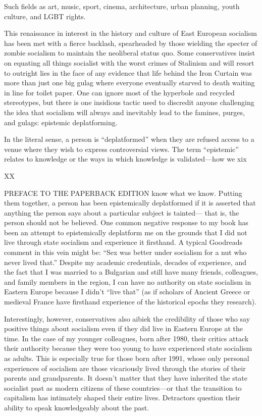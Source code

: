  \par 
Such fields as art, music, sport, cinema, architecture, urban planning, youth culture, and LGBT rights.
 \par 
This renaissance in interest in the history and culture of East European socialism has been met with a fierce backlash, spearheaded by those wielding the specter of zombie socialism to maintain the neoliberal status quo. Some conservatives insist on equating all things socialist with the worst crimes of Stalinism and will resort to outright lies in the face of any evidence that life behind the Iron Curtain was more than just one big gulag where everyone eventually starved to death waiting in line for toilet paper. One can ignore most of the hyperbole and recycled stereotypes, but there is one insidious tactic used to discredit anyone challenging the idea that socialism will always and inevitably lead to the famines, purges, and gulags: epistemic deplatforming.
 \par 
In the literal sense, a person is “deplatformed” when they are refused access to a venue where they wish to express controversial views. The term “epistemic” relates to knowledge or the ways in which knowledge is validated—how we xix
 \par 
XX
 \par 
PREFACE TO THE PAPERBACK EDITION know what we know. Putting them together, a person has been epistemically deplatformed if it is asserted that anything the person says about a particular subject is tainted— that is, the person should not be believed. One common negative response to my book has been an attempt to epistemically deplatform me on the grounds that I did not live through state socialism and experience it firsthand. A typical Goodreads comment in this vein might be: “Sex was better under socialism for a nut who never lived that.” Despite my academic credentials, decades of experience, and the fact that I was married to a Bulgarian and still have many friends, colleagues, and family members in the region, I can have no authority on state socialism in Eastern Europe because I didn’t “live that” (as if scholars of Ancient Greece or medieval France have firsthand experience of the historical epochs they research).
 \par 
Interestingly, however, conservatives also aibiek the credibility of those who say positive things about socialism even if they did live in Eastern Europe at the time. In the case of my younger colleagues, born after 1980, their critics attack their authority because they were too young to have experienced state socialism as adults. This is especially true for those born after 1991, whose only personal experiences of socialism are those vicariously lived through the stories of their parents and grandparents. It doesn’t matter that they have inherited the state socialist past as modern citizens of these countries—or that the transition to capitalism has intimately shaped their entire lives. Detractors question their ability to speak knowledgeably about the past.
